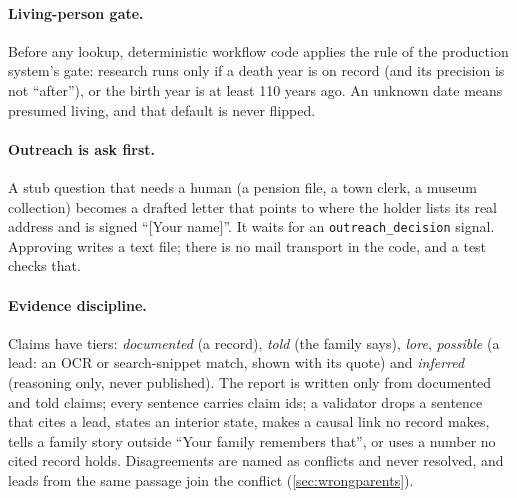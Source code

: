\label{sec:gate}\paragraph{Living-person gate.} Before any lookup, deterministic workflow code applies the rule of the production system's gate: research runs only if a death year is on record (and its precision is not ``after''), or the birth year is at least 110 years ago. An unknown date means presumed living, and that default is never flipped.

\paragraph{Outreach is ask first.} A stub question that needs a human (a pension file, a town clerk, a museum collection) becomes a drafted letter that points to where the holder lists its real address and is signed ``[Your name]''. It waits for an \texttt{outreach\_decision} signal. Approving writes a text file; there is no mail transport in the code, and a test checks that.

\paragraph{Evidence discipline.} Claims have tiers: \emph{documented} (a record), \emph{told} (the family says), \emph{lore}, \emph{possible} (a lead: an OCR or search-snippet match, shown with its quote) and \emph{inferred} (reasoning only, never published). The report is written only from documented and told claims; every sentence carries claim ids; a validator drops a sentence that cites a lead, states an interior state, makes a causal link no record makes, tells a family story outside ``Your family remembers that'', or uses a number no cited record holds. Disagreements are named as conflicts and never resolved, and leads from the same passage join the conflict (\cref{sec:wrongparents}).
